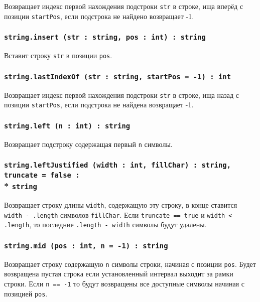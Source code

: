 Возвращает индекс первой нахождения подстроки \texttt{str} в строке, ища вперёд с позиции \texttt{startPos}, если подстрока не найдено возвращает -1.

\subsubsection{\texttt{string.insert (str : string, pos : int) : string}}

Вставит строку \texttt{str} в позиции \texttt{pos}.

\subsubsection{\texttt{string.lastIndexOf (str : string, startPos = -1) : int}}

Возвращает индекс первой нахождения подстроки \texttt{str} в строке, ища назад с позиции \texttt{startPos}, если подстрока не найдена возвращает -1.

\subsubsection{\texttt{string.left (n : int) : string}}

Возвращает подстроку содержащая первый \texttt{n} символы.

\subsubsection{\texttt{string.leftJustified (width : int, fillChar) : string, truncate = false :}\\* \texttt{string}}

Возвращает строку длины \texttt{width}, содержащую эту строку, в конце ставится \texttt{width - .length} символов \texttt{fillChar}. Если \texttt{truncate == true} и \texttt{width < .length}, то последние \texttt{.length - width} символы будут удалены.

\subsubsection{\texttt{string.mid (pos : int, n = -1) : string}}

Возвращает строку содержащую \texttt{n} символы строки, начиная с позиции \texttt{pos}. Будет возвращена пустая строка если установленный интервал выходит за рамки строки. Если \texttt{n == -1} то будут возвращены все доступные символы начиная с позицией \texttt{pos}.

